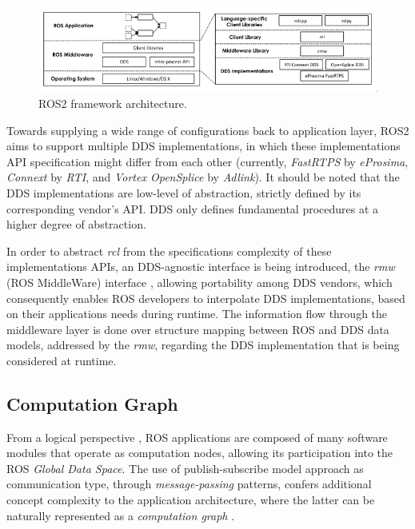 \begin{figure}[H]
    \centering
    \includegraphics[width=\linewidth]{images/ros2-architecture.png}
    \caption{ROS2 framework architecture.}
    \label{fig:ros2-architecture}
\end{figure}

Towards supplying a wide range of configurations back to application layer, ROS2 aims to support multiple DDS implementations, in which these implementations API specification might differ from each other (currently, \textit{FastRTPS} by \textit{eProsima}, \textit{Connext} by \textit{RTI}, and \textit{Vortex OpenSplice} by \textit{Adlink}). It should be noted that the DDS implementations are low-level of abstraction, strictly defined by its corresponding vendor's API. DDS only defines fundamental procedures at a higher degree of abstraction.  

In order to abstract \textit{rcl} from the specifications complexity of these implementations APIs, an DDS-agnostic interface is being introduced, the \textit{rmw} (ROS MiddleWare) interface \cite{casini2019response}, allowing portability among DDS vendors, which consequently enables ROS developers to interpolate DDS implementations, based on their applications needs during runtime. The information flow through the middleware layer is done over structure mapping between ROS and DDS data models, addressed by the \textit{rmw}, regarding the DDS implementation that is being considered at runtime.

\subsection{Computation Graph}

From a logical perspective \cite{casini2019response}, ROS applications are composed of many software modules that operate as computation nodes, allowing its participation into the ROS \textit{Global Data Space}. The use of publish-subscribe model approach as communication type, through \textit{message-passing} patterns, confers additional concept complexity to the application architecture, where the latter can be naturally represented as a \textit{computation graph} \cite{cousins2010welcome}.

